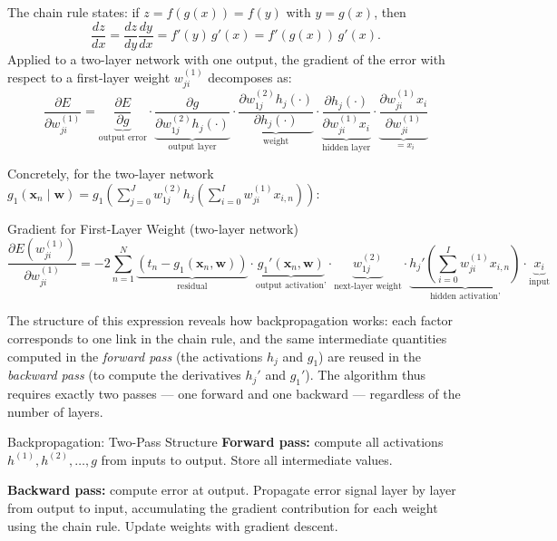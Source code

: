 \documentclass[11pt,a4paper]{article}
\begin{document}
The chain rule states: if $z = f(g(x)) = f(y)$ with $y = g(x)$, then
\[
\frac{dz}{dx} = \frac{dz}{dy}\frac{dy}{dx} = f'(y)\,g'(x) = f'(g(x))\,g'(x).
\]
Applied to a two-layer network with one output, the gradient of the error with respect to a first-layer weight $w_{ji}^{(1)}$ decomposes as:
\[
\frac{\partial E}{\partial w_{ji}^{(1)}} = \underbrace{\frac{\partial E}{\partial g}}_{\text{output error}} \cdot \underbrace{\frac{\partial g}{\partial w_{1j}^{(2)} h_j(\cdot)}}_{\text{output layer}} \cdot \underbrace{\frac{\partial w_{1j}^{(2)} h_j(\cdot)}{\partial h_j(\cdot)}}_{\text{weight}} \cdot \underbrace{\frac{\partial h_j(\cdot)}{\partial w_{ji}^{(1)} x_i}}_{\text{hidden layer}} \cdot \underbrace{\frac{\partial w_{ji}^{(1)} x_i}{\partial w_{ji}^{(1)}}}_{\;= x_i}
\]

Concretely, for the two-layer network $g_1(\mathbf{x}_n \mid \mathbf{w}) = g_1\!\left(\sum_{j=0}^J w_{1j}^{(2)} h_j\!\left(\sum_{i=0}^I w_{ji}^{(1)} x_{i,n}\right)\right)$:

\begin{thmbox}{Gradient for First-Layer Weight (two-layer network)}
\[
\frac{\partial E(w_{ji}^{(1)})}{\partial w_{ji}^{(1)}} = -2\sum_{n=1}^N
\underbrace{(t_n - g_1(\mathbf{x}_n, \mathbf{w}))}_{\text{residual}} \cdot
\underbrace{g_1'(\mathbf{x}_n, \mathbf{w})}_{\text{output activation'}} \cdot
\underbrace{w_{1j}^{(2)}}_{\text{next-layer weight}} \cdot
\underbrace{h_j'\!\left(\sum_{i=0}^I w_{ji}^{(1)} x_{i,n}\right)}_{\text{hidden activation'}} \cdot
\underbrace{x_i}_{\text{input}}
\]
\end{thmbox}

The structure of this expression reveals how backpropagation works: each factor corresponds to one link in the chain rule, and the same intermediate quantities computed in the \emph{forward pass} (the activations $h_j$ and $g_1$) are reused in the \emph{backward pass} (to compute the derivatives $h_j'$ and $g_1'$). The algorithm thus requires exactly two passes — one forward and one backward — regardless of the number of layers.

\begin{algobox}{Backpropagation: Two-Pass Structure}
\textbf{Forward pass:} compute all activations $h^{(1)}, h^{(2)}, \ldots, g$ from inputs to output. Store all intermediate values.\par\medskip
\textbf{Backward pass:} compute error at output. Propagate error signal layer by layer from output to input, accumulating the gradient contribution for each weight using the chain rule. Update weights with gradient descent.
\end{algobox}
\end{document}
